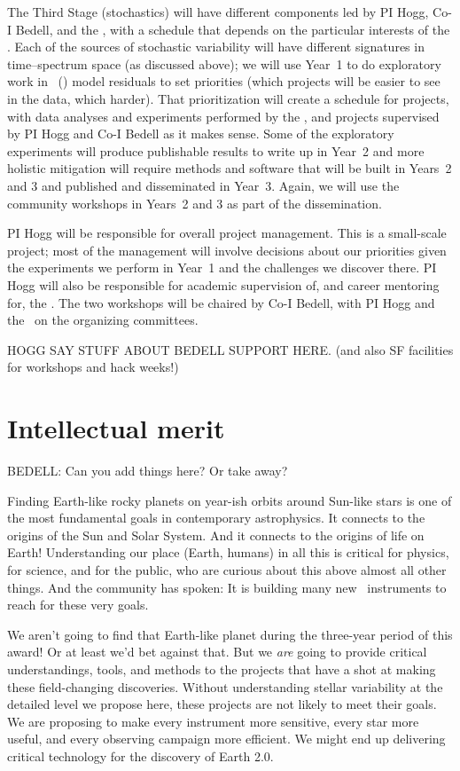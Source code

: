 \documentclass[12pt, letterpaper]{article}
\begin{document}
The Third Stage (stochastics) will have different components led by PI
Hogg, Co-I Bedell, and the \GRA, with a schedule that depends on the
particular interests of the \GRA.
Each of the sources of stochastic variability will have different
signatures in time--spectrum space (as discussed above); we will use
Year~1 to do exploratory work in \wobble\ (\citealt{Bedell2019})
model residuals to set priorities
(which projects will be easier to see in the data, which harder).
That prioritization will create a schedule for projects, with data
analyses and experiments performed by the \GRA, and projects supervised
by PI Hogg and Co-I Bedell as it makes sense.
Some of the exploratory experiments will produce publishable results
to write up in Year~2 and more holistic mitigation will require
methods and software that will be built in Years~2 and 3 and published
and disseminated in Year~3.
Again, we will use the community workshops in Years~2 and 3 as part of
the dissemination.

PI Hogg will be responsible for overall project management. This is a
small-scale project; most of the management will involve decisions about our
priorities given the experiments we perform in Year~1 and the
challenges we discover there.
PI Hogg will also be responsible for academic supervision of, and
career mentoring for, the \GRA.
The two workshops will be chaired by Co-I Bedell, with PI Hogg and
the \GRA\ on the organizing committees.



HOGG SAY STUFF ABOUT BEDELL SUPPORT HERE. (and also SF facilities for workshops and hack weeks!)

\section{Intellectual merit}

BEDELL: Can you add things here? Or take away?

Finding Earth-like rocky planets on year-ish orbits
around Sun-like stars is one of the most fundamental goals
in contemporary astrophysics.
It connects to the origins of the Sun and Solar System.
And it connects to the origins of life on Earth!
Understanding our place (Earth, humans) in all this is critical for physics, for science, and for the
public, who are curious about this above almost all other things.
And the community has spoken:
It is building many new \EPRV\ instruments to reach for these very goals.

We aren't going to find that Earth-like planet during the three-year period of this
award! Or at least we'd bet against that.
But we \emph{are} going to provide critical understandings, tools, and methods to
the projects that have a shot at making these field-changing discoveries.
Without understanding stellar variability at the detailed level we propose here,
these projects are not likely to meet their goals.
We are proposing to make every instrument more sensitive, every star more useful,
and every observing campaign more efficient.
We might end up delivering critical technology for the discovery of Earth 2.0.
\end{document}
